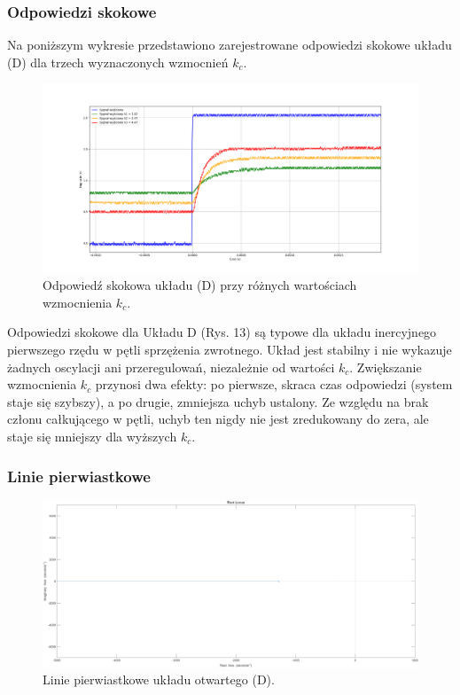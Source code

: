 \documentclass[12pt,a4paper]{article}
\begin{document}
	\subsubsection{Odpowiedzi skokowe}
	Na poniższym wykresie przedstawiono zarejestrowane odpowiedzi skokowe układu (D) dla trzech wyznaczonych wzmocnień \(k_c\).
	
	\begin{figure}[H]
	\centering
	\includegraphics[width=1\linewidth]{zdjecia/OdpSkokD.png}
	\caption{Odpowiedź skokowa układu (D) przy różnych wartościach wzmocnienia \(k_c\).}
	\label{fig:OdpSkokD}
	\end{figure}
	
	Odpowiedzi skokowe dla Układu D (Rys. 13) są typowe dla układu inercyjnego pierwszego rzędu w pętli sprzężenia zwrotnego. Układ jest stabilny i nie wykazuje żadnych oscylacji ani przeregulowań, niezależnie od wartości $k_c$. Zwiększanie wzmocnienia $k_c$ przynosi dwa efekty: po pierwsze, skraca czas odpowiedzi (system staje się szybszy), a po drugie, zmniejsza uchyb ustalony. Ze względu na brak członu całkującego w pętli, uchyb ten nigdy nie jest zredukowany do zera, ale staje się mniejszy dla wyższych $k_c$.
	
	\subsubsection{Linie pierwiastkowe}
	
	\begin{figure}[H]
		\centering
		\includegraphics[width=0.8\linewidth]{zdjecia/LP_ukladD.png}
		\caption{Linie pierwiastkowe układu otwartego (D).}
		\label{fig:LP_ukladD}
	\end{figure}
	
\end{document}
